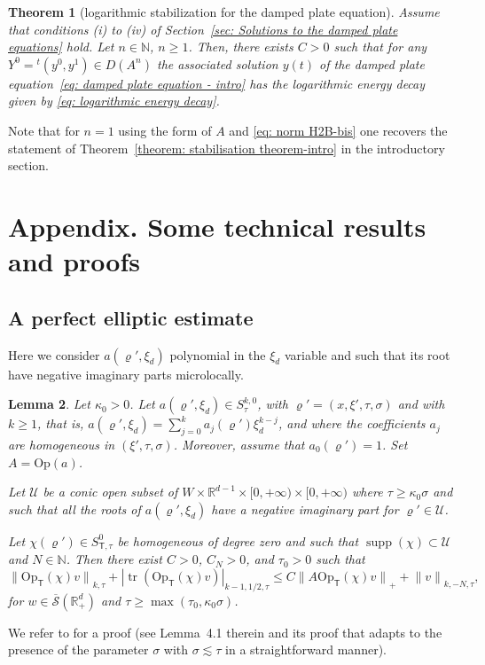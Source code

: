 \documentclass[10pt]{amsart}
\theoremstyle{plain}
\newtheorem{theorem}{Theorem}[section]
\newtheorem{lemma}[theorem]{Lemma}
\theoremstyle{definition}
\def\R{\mathbb{R}}
\def\N{\mathbb{N}}
\let\k\kappa
\let\y\varrho
\newcommand{\U}{\mathscr U}
\newcommand{\Op}{\ensuremath{\mathrm{Op}}}
\newcommand{\Opt}{\ensuremath{\mathrm{Op}_{\scriptscriptstyle{\mathsf{T}}}}}
\newcommand{\transp}{\ensuremath{\phantom{}^{t}}}
\newcommand{\Norm}[2]{{\| #1 \|}_{#2}}
\newcommand{\Normsc}[2]{{\| #1 \|}_{#2, \tau}}
\newcommand{\normsc}[2]{{| #1 |}_{#2, \tau}}
\newcommand{\Ssc}{S_\tau}
\newcommand{\Ssct}{S_{{\scriptscriptstyle{\mathsf T}},\tau}}
\newcommand{\Sbarp}{\ensuremath{\overline{\mathscr{S}}(\Rdp)}}
\newcommand{\Rdp}{\R^d_+}
\DeclareMathOperator{\supp}{supp}
\DeclareMathOperator{\trace}{tr}
\begin{document}
\begin{theorem}[logarithmic stabilization for the damped plate equation]
\label{theorem: stabilisation theorem}
Assume that conditions (i) to (iv) of Section~\ref{sec: Solutions to
the damped plate equations} hold. Let $n \in \N$, $n \geq 1$. Then, there exists $C>0$ such
that for any $Y^0 =\transp(y^0,y^1) \in D(A^n)$ the associated
solution $y(t)$ of the damped plate equation~\eqref{eq: damped plate equation - intro} has the logarithmic energy decay given by \eqref{eq: logarithmic energy decay}.
\end{theorem}

Note that for $n=1$ using the form of $A$ and \eqref{eq: norm H2B-bis}
one recovers the statement of Theorem~\ref{theorem: stabilisation theorem-intro} in the introductory section.

\appendix

\section*{Appendix. Some technical results and proofs}

\subsection{A perfect elliptic estimate}
\label{SB}
Here we consider $a(\y',\xi_d)$ polynomial in the $\xi_d$ variable and
such that its root have negative imaginary parts microlocally.

\begin{lemma}\label{el1}
Let $\k_0 >0$.
Let $a(\y',\xi_d)\in \Ssc^{k,0}$, with $\y'=(x,\xi',\tau,\sigma)$ and with
$k\geq 1$,
that is, $a(\y',\xi_d) = \sum_{j=0}^k a_j (\y') \xi_d^{k-j}$,
and where the coefficients $a_j$ are homogeneous in
$(\xi',\tau,\sigma)$. Moreover, assume that $a_0(\y') =1$.
Set $A=\Op(a)$.

Let $\U$ be a conic open subset of $W \times\R^{d-1}\times
[0,+\infty) \times[0,+\infty)$ where $\tau \geq \k_0 \sigma$ and such
that all the roots of $a(\y',\xi_d)$ have a negative imaginary part for $\y'\in\U$.

Let $\chi(\y')\in \Ssct^{0}$ be homogeneous of degree zero and such
that $\supp(\chi)\subset\U$ and $N\in\N$. Then there exist $C>0$, $C_N>0$, and $\tau_0>0$ such that
\begin{equation*}
\Normsc{\Opt(\chi)v}{k}
+ \normsc{\trace(\Opt(\chi)v)}{k-1,1/2}
\leq C
\Norm{A \Opt(\chi) v}{+}
+ \Normsc{v}{k,-N},
\end{equation*}
for $w\in\Sbarp$ and $\tau\geq \max (\tau_0,\k_0 \sigma)$.
\end{lemma}
We refer to \cite{ML} for a proof (see Lemma~4.1 therein and its
proof that adapts to the presence of the parameter $\sigma$ with
$\sigma\lesssim \tau$ in a straightforward manner).
\end{document}
